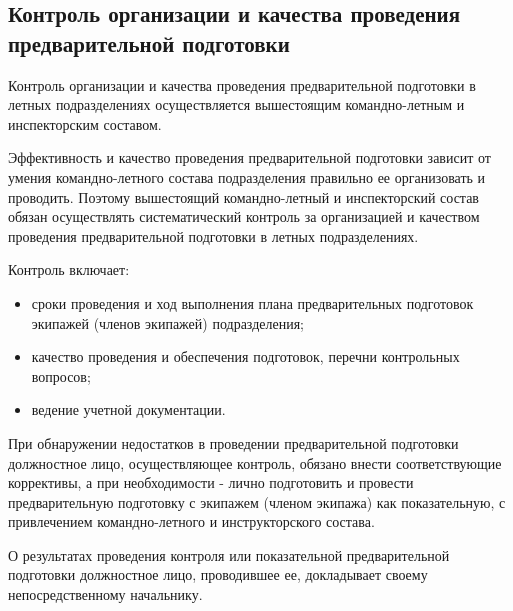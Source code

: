 \subsection{Контроль организации и качества проведения предварительной подготовки}


Контроль организации и качества проведения предварительной подготовки в летных подразделениях осуществляется вышестоящим командно-летным и инспекторским составом.

Эффективность и качество проведения предварительной подготовки зависит от умения командно-летного состава подразделения правильно ее организовать и проводить. Поэтому вышестоящий командно-летный и инспекторский состав обязан осуществлять систематический контроль за организацией и качеством проведения предварительной подготовки в летных подразделениях.

Контроль включает:
\begin{itemize}
    \item сроки проведения и ход выполнения плана предварительных подготовок экипажей (членов экипажей) подразделения;
    \item качество проведения и обеспечения подготовок, перечни контрольных вопросов;
    \item ведение учетной документации.
\end{itemize}

При обнаружении недостатков в проведении предварительной подготовки должностное лицо, осуществляющее контроль, обязано внести соответствующие коррективы, а при необходимости - лично подготовить и провести предварительную подготовку с экипажем (членом экипажа) как показательную, с привлечением командно-летного и инструкторского состава.

О результатах проведения контроля или показательной предварительной подготовки должностное лицо, проводившее ее, докладывает своему непосредственному начальнику.